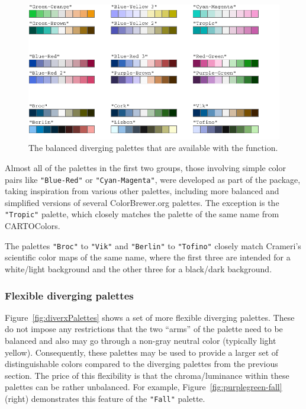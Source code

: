 \begin{figure}[ht!]

{\centering \includegraphics[width=1\linewidth]{color_files/figure-latex/diverPalettes-1} 

}

\caption{The balanced diverging palettes that are available with the  function.}\label{fig:diverPalettes}
\end{figure}

Almost all of the palettes in the first two groups, those
involving simple color pairs like
\texttt{"Blue-Red"} or \texttt{"Cyan-Magenta"}, were developed as part of the
 package, taking inspiration
from various other palettes, including more balanced and simplified
versions of several ColorBrewer.org palettes.
The exception is the \texttt{"Tropic"} palette,
which closely matches the palette of the same name from CARTOColors.

The palettes \texttt{"Broc"} to \texttt{"Vik"} and \texttt{"Berlin"} to \texttt{"Tofino"} closely
match Crameri's scientific color maps of the same name,
where the first three are intended for a white/light background and
the other three for a black/dark background.

\hypertarget{flexible-diverging-palettes}{%
\subsubsection{Flexible diverging palettes}\label{flexible-diverging-palettes}}

Figure~\ref{fig:diverxPalettes} shows a set of
more flexible diverging
palettes. These do not impose
any restrictions that the two ``arms'' of the palette need to be
balanced and also may go through a non-gray neutral color (typically
light yellow). Consequently, these palettes may be used to provide a larger
set of distinguishable colors compared to the diverging palettes from
the previous section. The price of this flexibility is that
the chroma/luminance within these palettes
can be rather unbalanced.
For example, Figure~\ref{fig:purplegreen-fall} (right) demonstrates this
feature of the \texttt{"Fall"} palette.

